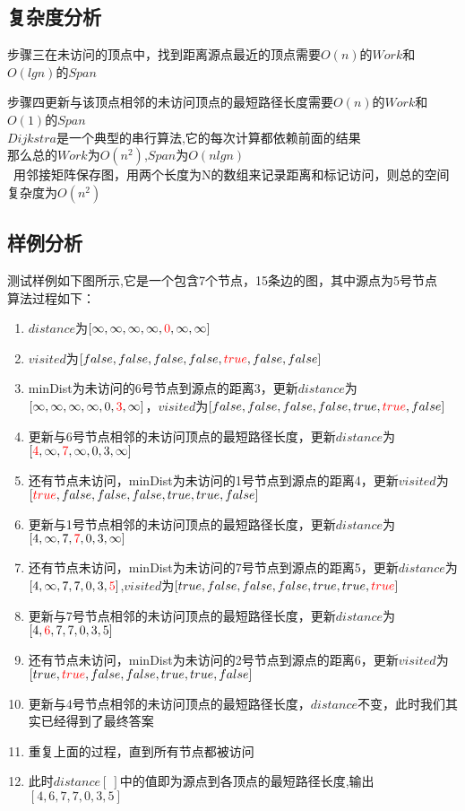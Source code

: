 \documentclass[UTF8,a4paperdui, %
]{ctexart}
\begin{document}
\subsection{复杂度分析}
步骤三在未访问的顶点中，找到距离源点最近的顶点需要$O(n)$的$Work$和$O(lgn)$的$Span$\par
步骤四更新与该顶点相邻的未访问顶点的最短路径长度需要$O(n)$的$Work$和$O(1)$的$Span$\\
$Dijkstra$是一个典型的串行算法,它的每次计算都依赖前面的结果\\
那么总的$Work$为$O(n^2)$,$Span$为$O(nlgn)$\\\
用邻接矩阵保存图，用两个长度为N的数组来记录距离和标记访问，则总的空间复杂度为$O(n^2)$
\subsection{样例分析}
测试样例如下图所示,它是一个包含7个节点，15条边的图，其中源点为5号节点
\\
算法过程如下：
\begin{enumerate}
    \item $distance$为$[\infty,\infty,\infty,\infty,\textcolor{red}{0},\infty,\infty]$
    \item $visited$为$[false,false,false,false,\textcolor{red}{true},false,false]$
    \item minDist为未访问的6号节点到源点的距离3，更新$distance$为$[\infty,\infty,\infty,\infty,0,\textcolor{red}{3},\infty]$，$visited$为$[false,false,false,false,true,\textcolor{red}{true},false]$
    \item 更新与6号节点相邻的未访问顶点的最短路径长度，更新$distance$为$[\textcolor{red}{4},\infty,\textcolor{red}{7},\infty,0,3,\infty]$
    \item 还有节点未访问，minDist为未访问的1号节点到源点的距离4，更新$visited$为$[\textcolor{red}{true},false,false,false,true,true,false]$
    \item 更新与1号节点相邻的未访问顶点的最短路径长度，更新$distance$为$[4,\infty,7,\textcolor{red}{7},0,3,\infty]$
    \item 还有节点未访问，minDist为未访问的7号节点到源点的距离5，更新$distance$为$[4,\infty,7,7,0,3,\textcolor{red}{5}]$,$visited$为$[true,false,false,false,true,true,\textcolor{red}{true}]$
    \item 更新与7号节点相邻的未访问顶点的最短路径长度，更新$distance$为$[4,\textcolor{red}{6},7,7,0,3,5]$
    \item 还有节点未访问，minDist为未访问的2号节点到源点的距离6，更新$visited$为$[true,\textcolor{red}{true},false,false,true,true,false]$
    \item 更新与4号节点相邻的未访问顶点的最短路径长度，$distance$不变，此时我们其实已经得到了最终答案
    \item 重复上面的过程，直到所有节点都被访问
    \item 此时$distance[\ ]$中的值即为源点到各顶点的最短路径长度,输出$[4,6,7,7,0,3,5]$
\end{enumerate}
\end{document}
